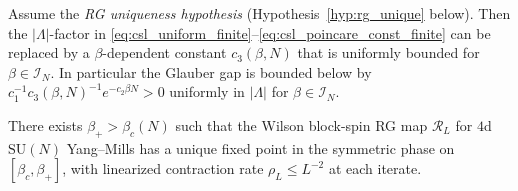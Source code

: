 \begin{theorem}
\label{thm:csl_uniform_conditional}
Assume the \emph{RG uniqueness hypothesis} (Hypothesis~\ref{hyp:rg_unique}
below). Then the $|\Lambda|$-factor in
\eqref{eq:csl_uniform_finite}--\eqref{eq:csl_poincare_const_finite}
can be replaced by a $\beta$-dependent constant
$c_{3}(\beta,N)$ that is uniformly bounded for $\beta\in\mathcal{I}_{N}$.
In particular the Glauber gap is bounded below by
$c_{1}^{-1}c_{3}(\beta,N)^{-1}e^{-c_{2}\beta N}>0$ uniformly in $|\Lambda|$
for $\beta\in\mathcal{I}_{N}$.
\end{theorem}

\begin{hypothesis}
\label{hyp:rg_unique}
There exists $\beta_{+}>\beta_{c}(N)$ such that the Wilson
block-spin RG map $\mathcal{R}_{L}$ for $4$d $\mathrm{SU}(N)$
Yang--Mills has a unique fixed point in the symmetric phase on
$[\beta_{c},\beta_{+}]$, with linearized contraction rate
$\rho_{L}\le L^{-2}$ at each iterate.
\end{hypothesis}

